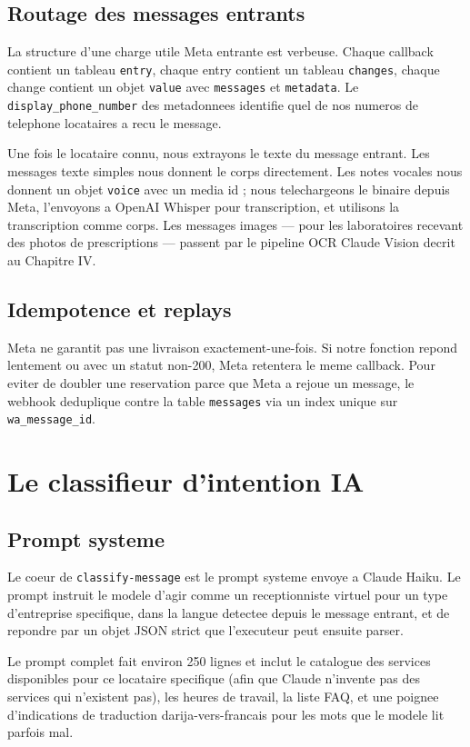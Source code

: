 \subsection{Routage des messages entrants}
La structure d'une charge utile Meta entrante est verbeuse. Chaque
callback contient un tableau \texttt{entry}, chaque entry contient un
tableau \texttt{changes}, chaque change contient un objet
\texttt{value} avec \texttt{messages} et \texttt{metadata}. Le
\texttt{display\_phone\_number} des metadonnees identifie quel de nos
numeros de telephone locataires a recu le message.

Une fois le locataire connu, nous extrayons le texte du message
entrant. Les messages texte simples nous donnent le corps directement.
Les notes vocales nous donnent un objet \texttt{voice} avec un media
id ; nous telechargeons le binaire depuis Meta, l'envoyons a OpenAI
Whisper pour transcription, et utilisons la transcription comme corps.
Les messages images --- pour les laboratoires recevant des photos de
prescriptions --- passent par le pipeline OCR Claude Vision decrit au
Chapitre IV.

\subsection{Idempotence et replays}
Meta ne garantit pas une livraison exactement-une-fois. Si notre
fonction repond lentement ou avec un statut non-200, Meta retentera le
meme callback. Pour eviter de doubler une reservation parce que Meta
a rejoue un message, le webhook deduplique contre la table
\texttt{messages} via un index unique sur \texttt{wa\_message\_id}.

\section{Le classifieur d'intention IA}

\subsection{Prompt systeme}
Le coeur de \texttt{classify-message} est le prompt systeme envoye a
Claude Haiku. Le prompt instruit le modele d'agir comme un
receptionniste virtuel pour un type d'entreprise specifique, dans la
langue detectee depuis le message entrant, et de repondre par un
objet JSON strict que l'executeur peut ensuite parser.

Le prompt complet fait environ 250 lignes et inclut le catalogue des
services disponibles pour ce locataire specifique (afin que Claude
n'invente pas des services qui n'existent pas), les heures de travail,
la liste FAQ, et une poignee d'indications de traduction
darija-vers-francais pour les mots que le modele lit parfois mal.

